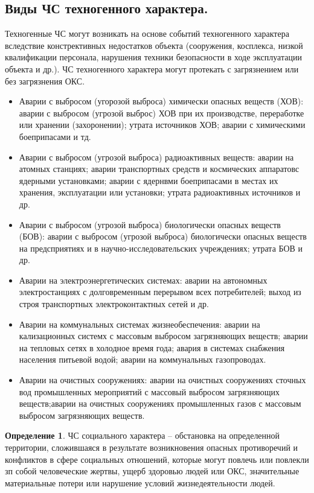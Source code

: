 \documentclass[a4paper, 12pt]{article}
\theoremstyle{definition}
\newtheorem*{definition}{Определение}
\begin{document}
        \subsection{Виды ЧС техногенного характера.}
        Техногенные ЧС могут возникать на основе событий техногенного характера вследствие констрективных недостатков объекта (сооружения, косплекса, низкой квалификации персонала, нарушения техники безопасности в ходе эксплуатации объекта и др.). ЧС техногенного характера могут протекать с загрязнением или без загрязнения ОКС.
        \begin{itemize}
            \item Аварии с выбросом (угорозой выброса) химически опасных веществ (ХОВ): аварии с выбросом (угрозой выброс) ХОВ при их производстве, переработке или хранении (захоронении); утрата источников ХОВ; аварии с химическими боеприпасами и тд.
            \item Аварии с выбросом (угрозой выброса) радиоактивных веществ: аварии на атомных станциях; аварии транспортных средств и космических аппаратовс ядерными установками; аварии с ядернвми боеприпасами в местах их хранения, эксплуатации или установки; утрата радиоактивных источников и др.
            \item Аварии с выбросом (угрозой выброса) биологически опасных веществ\\ (БОВ): аварии с выбросом (угрозой выброса) биологически опасных веществ на предсприятиях и в научно-исследовательских учреждениях; утрата БОВ и др.
            \item Аварии на электроэнергетических системах: аварии на автономных электростанциях с долговременным перерывом всех потребителей; выход из строя транспортных электроконтактных сетей и др.
            \item Аварии на коммунальных системах жизнеобеспечения: аварии на кализационных системх с массовым выбросом загрязняющих веществ; аварии на тепловых сетях в холодное время года; авария в системах снабжения населения питьевой водой; аварии на коммунальных газопроводах.
            \item Аварии на очистных сооружениях: аварии на очистных сооружениях сточных вод промышленных мероприятий с массовый выбросом загрязняющих веществ;аварии на очистных сооружениях промышленных газов с массовым выбросом загрязняющих веществ.
        \end{itemize} 
        \begin{definition}
            ЧС социального характера -- обстановка на определенной территории, сложившаяся в результате возникновения опасных противоречий и конфликтов в сфере социальных отношений, которые могут повлечь или повлекли зп собой человеческие жертвы, ущерб здоровью людей или ОКС, значительные материальные потери или нарушение условий жизнедеятельности людей.
        \end{definition}
\end{document}
